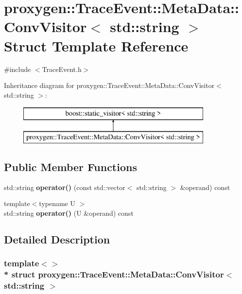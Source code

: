 \section{proxygen\+:\+:Trace\+Event\+:\+:Meta\+Data\+:\+:Conv\+Visitor$<$ std\+:\+:string $>$ Struct Template Reference}
\label{structproxygen_1_1TraceEvent_1_1MetaData_1_1ConvVisitor_3_01std_1_1string_01_4}


{\ttfamily \#include $<$Trace\+Event.\+h$>$}

Inheritance diagram for proxygen\+:\+:Trace\+Event\+:\+:Meta\+Data\+:\+:Conv\+Visitor$<$ std\+:\+:string $>$\+:\begin{figure}[H]
\begin{center}
\leavevmode
\includegraphics[height=2.000000cm]{structproxygen_1_1TraceEvent_1_1MetaData_1_1ConvVisitor_3_01std_1_1string_01_4}
\end{center}
\end{figure}
\subsection*{Public Member Functions}
\begin{DoxyCompactItemize}
\item 
std\+::string {\bf operator()} (const std\+::vector$<$ std\+::string $>$ \&operand) const 
\item 
{\footnotesize template$<$typename U $>$ }\\std\+::string {\bf operator()} (U \&operand) const 
\end{DoxyCompactItemize}


\subsection{Detailed Description}
\subsubsection*{template$<$$>$\\*
struct proxygen\+::\+Trace\+Event\+::\+Meta\+Data\+::\+Conv\+Visitor$<$ std\+::string $>$}




